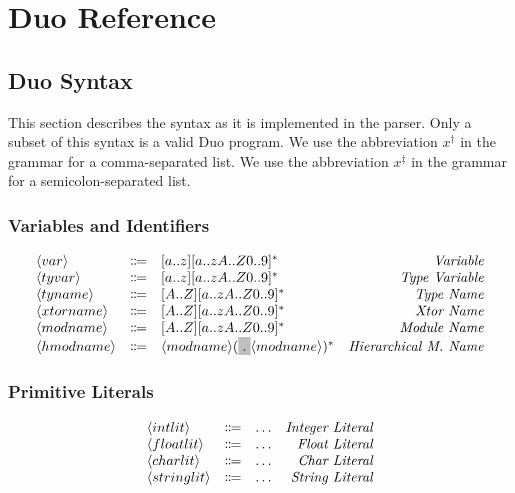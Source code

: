\documentclass[11pt]{article}
\newcommand{\nonterminal}[1]{\langle #1 \rangle}
\newcommand{\terminal}[1]{\colorbox{lightgray}{\vphantom{X}#1}}
\newcommand{\commalist}[1]{#1^{\dagger}}
\newcommand{\semicolonlist}[1]{#1^{\ddagger}}
\begin{document}
\section{Duo Reference}

\subsection{Duo Syntax}
This section describes the syntax as it is implemented in the parser.
Only a subset of this syntax is a valid Duo program.
We use the abbreviation $\commalist{x}$ in the grammar for a comma-separated list.
We use the abbreviation $\semicolonlist{x}$ in the grammar for a semicolon-separated list.

\subsubsection{Variables and Identifiers}
\[
  \begin{array}{lclr}
    \nonterminal{var} & \Coloneqq & [a..z][a..zA..Z0..9]^{\ast} & \emph{Variable} \\
    \nonterminal{tyvar} & \Coloneqq & [a..z][a..zA..Z0..9]^{\ast} & \emph{Type Variable} \\
    \nonterminal{tyname} & \Coloneqq & [A..Z][a..zA..Z0..9]^{\ast} & \emph{Type Name} \\
    \nonterminal{xtorname} & \Coloneqq & [A..Z][a..zA..Z0..9]^{\ast} & \emph{Xtor Name} \\
    \nonterminal{modname} & \Coloneqq &  [A..Z][a..zA..Z0..9]^{\ast} & \emph{Module Name} \\
    \nonterminal{hmodname} & \Coloneqq & \nonterminal{modname}(\terminal{.}\nonterminal{modname})^{\ast} & \emph{Hierarchical M. Name}
  \end{array}
\]

\subsubsection{Primitive Literals}
\[
  \begin{array}{lclr}
    \nonterminal{intlit} & \Coloneqq & \ldots & \emph{Integer Literal} \\
    \nonterminal{floatlit} & \Coloneqq & \ldots & \emph{Float Literal} \\
    \nonterminal{charlit} & \Coloneqq & \ldots & \emph{Char Literal} \\
    \nonterminal{stringlit} & \Coloneqq & \ldots & \emph{String Literal} \\
  \end{array}
\]
\end{document}
